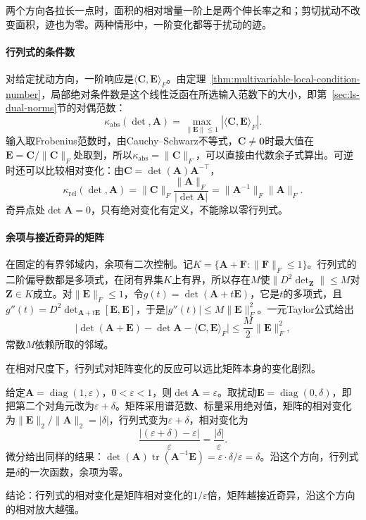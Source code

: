 两个方向各拉长一点时，面积的相对增量一阶上是两个伸长率之和；剪切扰动不改变面积，迹也为零。两种情形中，一阶变化都等于扰动的迹。

\paragraph{行列式的条件数}
对给定扰动方向，一阶响应是$\langle\bm C,\bm E\rangle_F$。由定理~\ref{thm:multivariable-local-condition-number}，局部绝对条件数是这个线性泛函在所选输入范数下的大小，即第~\ref{sec:ls-dual-norms}节的对偶范数：
\[
 \kappa_{\mathrm{abs}}(\det,\bm A)=\max_{\lVert\bm E\rVert\leq1}|\langle\bm C,\bm E\rangle_F| .
\]
输入取Frobenius范数时，由Cauchy--Schwarz不等式，$\bm C\neq\bm0$时最大值在$\bm E=\bm C/\lVert\bm C\rVert_F$处取到，所以$\kappa_{\mathrm{abs}}=\lVert\bm C\rVert_F$，可以直接由代数余子式算出。可逆时还可以比较相对变化：由$\bm C=\det(\bm A)\bm A^{-\top}$，
\[
 \kappa_{\mathrm{rel}}(\det,\bm A)=\lVert\bm C\rVert_F\frac{\lVert\bm A\rVert_F}{|\det\bm A|}=\lVert\bm A^{-1}\rVert_F\lVert\bm A\rVert_F .
\]
奇异点处$\det\bm A=0$，只有绝对变化有定义，不能除以零行列式。

\paragraph{余项与接近奇异的矩阵}
在固定的有界邻域内，余项有二次控制。记$K=\{\bm A+\bm F:\lVert\bm F\rVert_F\leq1\}$。行列式的二阶偏导数都是多项式，在闭有界集$K$上有界，所以存在$M$使$\lVert D^2\det_{\bm Z}\rVert\leq M$对$\bm Z\in K$成立。对$\lVert\bm E\rVert_F\leq1$，令$g(t)=\det(\bm A+t\bm E)$，它是$t$的多项式，且$g''(t)=D^2\det_{\bm A+t\bm E}[\bm E,\bm E]$，于是$|g''(t)|\leq M\lVert\bm E\rVert_F^2$。一元Taylor公式给出
\[
 \bigl|\det(\bm A+\bm E)-\det\bm A-\langle\bm C,\bm E\rangle_F\bigr|\leq\frac M2\lVert\bm E\rVert_F^2 ,
\]
常数$M$依赖所取的邻域。

在相对尺度下，行列式对矩阵变化的反应可以远比矩阵本身的变化剧烈。
\begin{example}[接近奇异时的行列式]
\label{ex:ls-determinant-near-singular}
给定$\bm A=\operatorname{diag}(1,\varepsilon)$，$0<\varepsilon<1$，则$\det\bm A=\varepsilon$。取扰动$\bm E=\operatorname{diag}(0,\delta)$，即把第二个对角元改为$\varepsilon+\delta$。矩阵采用谱范数、标量采用绝对值，矩阵的相对变化为$\lVert\bm E\rVert_2/\lVert\bm A\rVert_2=|\delta|$，行列式变为$\varepsilon+\delta$，相对变化为
\[
 \frac{|(\varepsilon+\delta)-\varepsilon|}{\varepsilon}=\frac{|\delta|}{\varepsilon}.
\]
微分给出同样的结果：$\det(\bm A)\operatorname{tr}(\bm A^{-1}\bm E)=\varepsilon\cdot\delta/\varepsilon=\delta$。沿这个方向，行列式是$\delta$的一次函数，余项为零。

结论：行列式的相对变化是矩阵相对变化的$1/\varepsilon$倍，矩阵越接近奇异，沿这个方向的相对放大越强。
\end{example}

